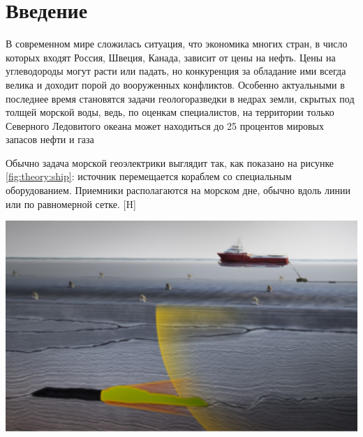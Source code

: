 \documentclass[a4paper,14pt]{article}
\makeatletter
\renewenvironment{figure}[1][\fps@figure]{
  \edef\@tempa{\noexpand\@float{figure}[#1]}
  \@tempa
  \addtocounter{foofigure}{1}
}{
  \end@float
}
\makeatother
\begin{document}

\tableofcontents


\clearpage
{}
\section*{Введение}


В современном мире сложилась ситуация, что экономика многих стран, в число которых входят Россия, Швеция, Канада, зависит от цены на нефть. Цены на углеводороды могут расти или падать, но конкуренция за обладание ими всегда велика и доходит порой до вооруженных конфликтов. Особенно актуальными в последнее время становятся задачи геологоразведки в недрах земли, скрытых под толщей морской воды, ведь, по оценкам специалистов, на территории только Северного Ледовитого океана может находиться до 25 процентов мировых запасов нефти и газа~\citep{shurina}

Обычно задача морской геоэлектрики выглядит так, как показано на рисунке \ref{fig:theory:ship}: источник перемещается кораблем со специальным оборудованием. Приемники располагаются на морском дне, обычно вдоль линии или по равномерной сетке.
\begin{figure}[H]
	\centering
	\includegraphics[scale=0.25]{theory/10000000000004B4000002D101BC1A4D.png}
	\caption{задача морской геоэлектрики}
	\label{fig:theory:ship}
\end{figure}
\end{document}
